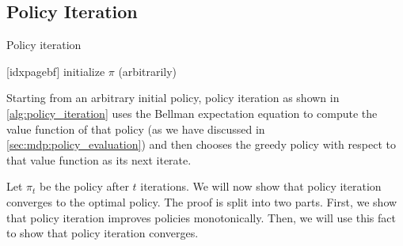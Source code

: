 \subsection{Policy Iteration}

\begin{algorithm}
  \caption{Policy iteration}[idxpagebf]\label{alg:policy_iteration}
  initialize $\pi$ (arbitrarily)\;
\end{algorithm}

Starting from an arbitrary initial policy, policy iteration as shown in \cref{alg:policy_iteration} uses the Bellman expectation equation to compute the value function of that policy (as we have discussed in \cref{sec:mdp:policy_evaluation}) and then chooses the greedy policy with respect to that value function as its next iterate.

Let $\pi_t$ be the policy after $t$ iterations. We will now show that policy iteration converges to the optimal policy.
The proof is split into two parts.
First, we show that policy iteration improves policies monotonically.
Then, we will use this fact to show that policy iteration converges.

